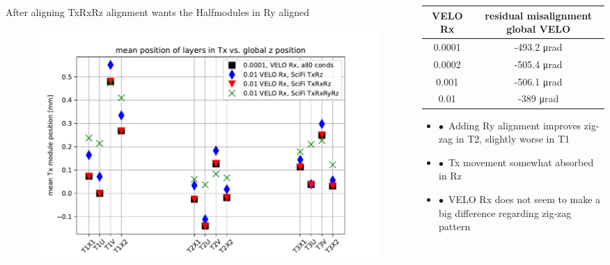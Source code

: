 \documentclass[aspectratio=1610, 12pt]{beamer}
\begin{document}
\begin{frame}
  \begin{columns}
    \begin{column}[c]{0.5\textwidth}
      After aligning TxRxRz \to alignment wants the Halfmodules in Ry aligned 
      \begin{figure}
        \includegraphics[width=\textwidth]{plots/03-19/all_runs_rx_glob_z_vs_local_Tx.pdf}
      \end{figure}
    \end{column}
    \begin{column}[c]{0.5\textwidth}
      \begin{table}
        \centering
          \begin{tabular}{c c}
          \toprule
            VELO Rx & residual misalignment global VELO \\
          \midrule
            0.0001 & -493.2 \si{\micro\radian} \\
            0.0002 & -505.4 \si{\micro\radian} \\
            0.001  & -506.1 \si{\micro\radian} \\
            0.01   & -389 \si{\micro\radian} \\
          \bottomrule
        \end{tabular}
      \end{table}
      \begin{itemize}
        \item $\bullet$\ Adding Ry alignment improves zig-zag in T2, slightly worse in T1
        \item $\bullet$\ Tx movement somewhat absorbed in Rz
        \item $\bullet$\ VELO Rx does not seem to make a big difference regarding zig-zag pattern
      \end{itemize}
    \end{column}
  \end{columns}
\end{frame}
\end{document}
